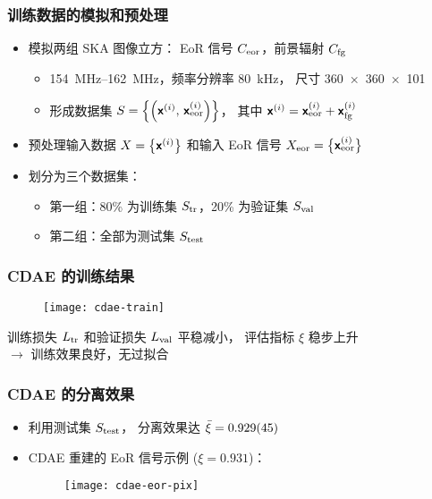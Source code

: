 \documentclass{beamer}
\begin{document}
\begin{frame}[subsec]
  \frametitle{训练数据的模拟和预处理}
  \begin{itemize}
    \item 模拟两组 SKA 图像立方：
      EoR 信号 $C_{\text{eor}}$，前景辐射 $C_{\text{fg}}$
      \begin{itemize}
        \item \SIrange{154}{162}{\MHz}，频率分辨率 \SI{80}{\kHz}，
          尺寸 \num{360 x 360 x 101}
        \item 形成数据集 $S = \left\{ \left(\bm{\mathsf{x}}^{(i)},
          \,\bm{\mathsf{x}}^{(i)}_{\text{eor}} \right) \right\}$，
          其中 $\bm{\mathsf{x}}^{(i)} = \bm{\mathsf{x}}^{(i)}_{\text{eor}} + \bm{\mathsf{x}}^{(i)}_{\text{fg}}$
      \end{itemize}
    \item 预处理输入数据 $X = \big\{ \bm{\mathsf{x}}^{(i)} \big\}$
      和输入 EoR 信号 $X_{\text{eor}} = \big\{ \bm{\mathsf{x}}^{(i)}_{\text{eor}} \big\}$
    \item 划分为三个数据集：
      \begin{itemize}
        \item 第一组：80\% 为训练集 $S_{\text{tr}}$，20\% 为验证集 $S_{\text{val}}$
        \item 第二组：全部为测试集 $S_{\text{test}}$
      \end{itemize}
  \end{itemize}
\end{frame}

\begin{frame}[subsec]
  \frametitle{CDAE 的训练结果}
  \begin{figure}
    \centering
    \texttt{[image: cdae-train]}
  \end{figure}
  \vspace{-1ex}
  训练损失 $L_{\text{tr}}$ 和验证损失 $L_{\text{val}}$ 平稳减小，
  评估指标 $\xi$ 稳步上升 \\
  $\rightarrow$
  训练效果良好，无过拟合
\end{frame}

\begin{frame}[subsec]
  \frametitle{CDAE 的分离效果}
  \begin{itemize}
    \item 利用测试集 $S_{\text{test}}$，
      分离效果达 $\bar{\xi} = \num{0.929 +- 0.045}$
    \item CDAE 重建的 EoR 信号示例 ($\xi = 0.931$)：
      \begin{figure}
        \centering
        \texttt{[image: cdae-eor-pix]}
      \end{figure}
  \end{itemize}
\end{frame}
\end{document}
